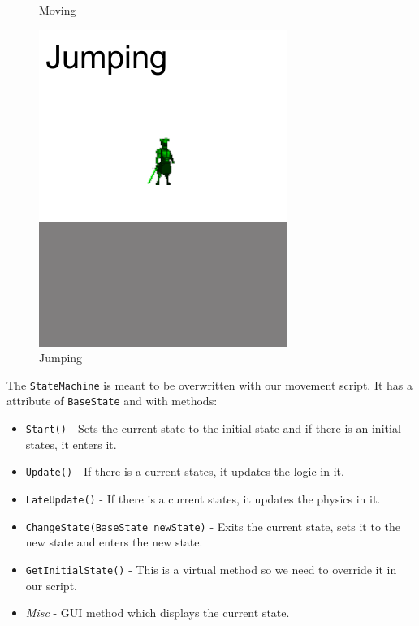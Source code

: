\documentclass[a4paper,12pt,openright]{book}
\begin{document}
\begin{figure}[!hb]
  \caption{Moving}\label{StateFig:Moving}
\endminipage\hfill
{}%
  \includegraphics[width=\linewidth]{Images/JumpingState.png}
  \caption{Jumping}\label{StateFig:Jumping}
\endminipage
\label{StateMachine}
\end{figure}

The \texttt{StateMachine} is meant to be overwritten with our movement script. It has a attribute of \texttt{BaseState} and with methods: 
\begin{itemize}
    \item \texttt{Start()} - Sets the current state to the initial state and if there is an initial states, it enters it.
    \item \texttt{Update()} - If there is a current states, it updates the logic in it.
    \item \texttt{LateUpdate()} - If there is a current states, it updates the physics in it.
    \item \texttt{ChangeState(BaseState newState)} - Exits the current state, sets it to the new state and enters the new state.
    \item \texttt{GetInitialState()} - This is a virtual method so we need to override it in our script.
    \item \emph{Misc} - GUI method which displays the current state.
\end{itemize}
\end{document}

